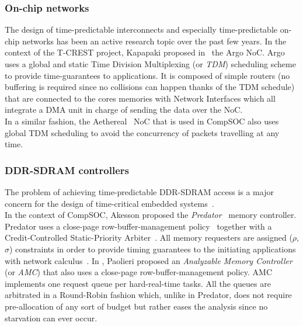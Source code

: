 \documentclass[main.tex]{subfiles}
\begin{document}
\subsubsection{On-chip networks}
The design of time-predictable interconnects and especially time-predictable
on-chip networks has been an active research topic over the past few years. In
the context of the T-CREST project, Kapapaki \etal proposed
in~\cite{Kasapaki14} the Argo NoC. Argo uses a global and static Time Division
Multiplexing (or \emph{TDM}) scheduling scheme to provide time-guarantees to
applications. It is composed of simple routers (no buffering is required since
no collisions can happen thanks of the TDM schedule) that are connected to the
cores memories with Network Interfaces which all integrate a DMA unit in charge
of sending the data over the NoC. \\

In a similar fashion, the Aethereal~\cite{Goossens2005} NoC that is used in
CompSOC also uses global TDM scheduling to avoid the concurrency of packets
travelling at any time.

\subsubsection{DDR-SDRAM controllers}
The problem of achieving time-predictable DDR-SDRAM access is a major concern
for the design of time-critical embedded systems~\cite{Wilhelm2009}. \\

In the context of CompSOC, Akesson \etal proposed the
\emph{Predator}~\cite{Akesson2007} memory controller. Predator uses a
close-page row-buffer-management policy~\cite{Jacob2007} together with a
Credit-Controlled Static-Priority Arbiter~\cite{Akesson2007_CCSP}. All memory
requesters are assigned ($\rho$, $\sigma$) constraints in order to provide
timing guarantees to the initiating applications with network
calculus~\cite{Cruz91}.  In \cite{Paolieri2009}, Paolieri \etal proposed an
\emph{Analyzable Memory Controller} (or \emph{AMC}) that also uses a close-page
row-buffer-management policy. AMC implements one request queue per
hard-real-time tasks. All the queues are arbitrated in a Round-Robin fashion
which, unlike in Predator, does not require pre-allocation of any sort of
budget but rather eases the analysis since no starvation can ever occur. \\
\end{document}

